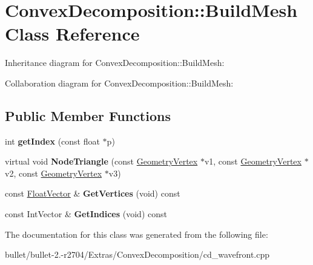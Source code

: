 \hypertarget{class_convex_decomposition_1_1_build_mesh}{\section{Convex\+Decomposition\+:\+:Build\+Mesh Class Reference}
\label{class_convex_decomposition_1_1_build_mesh}
}


Inheritance diagram for Convex\+Decomposition\+:\+:Build\+Mesh\+:


Collaboration diagram for Convex\+Decomposition\+:\+:Build\+Mesh\+:
\subsection*{Public Member Functions}
\begin{DoxyCompactItemize}
\item 
\hypertarget{class_convex_decomposition_1_1_build_mesh_a7fd61c2b18375be7765a6b00d1e13558}{int {\bfseries get\+Index} (const float $\ast$p)}\label{class_convex_decomposition_1_1_build_mesh_a7fd61c2b18375be7765a6b00d1e13558}

\item 
\hypertarget{class_convex_decomposition_1_1_build_mesh_a911ca970b0d9b810f20d25663086e2fa}{virtual void {\bfseries Node\+Triangle} (const \hyperlink{class_convex_decomposition_1_1_geometry_vertex}{Geometry\+Vertex} $\ast$v1, const \hyperlink{class_convex_decomposition_1_1_geometry_vertex}{Geometry\+Vertex} $\ast$v2, const \hyperlink{class_convex_decomposition_1_1_geometry_vertex}{Geometry\+Vertex} $\ast$v3)}\label{class_convex_decomposition_1_1_build_mesh_a911ca970b0d9b810f20d25663086e2fa}

\item 
\hypertarget{class_convex_decomposition_1_1_build_mesh_aa2dc0becb6faa3249a9b926a3deb9cd8}{const \hyperlink{class_float_vector}{Float\+Vector} \& {\bfseries Get\+Vertices} (void) const }\label{class_convex_decomposition_1_1_build_mesh_aa2dc0becb6faa3249a9b926a3deb9cd8}

\item 
\hypertarget{class_convex_decomposition_1_1_build_mesh_a7deed67349311919e77d1a32ea932147}{const Int\+Vector \& {\bfseries Get\+Indices} (void) const }\label{class_convex_decomposition_1_1_build_mesh_a7deed67349311919e77d1a32ea932147}

\end{DoxyCompactItemize}


The documentation for this class was generated from the following file\+:\begin{DoxyCompactItemize}
\item 
bullet/bullet-\/2.-\/r2704/\+Extras/\+Convex\+Decomposition/cd\+\_\+wavefront.\+cpp\end{DoxyCompactItemize}
